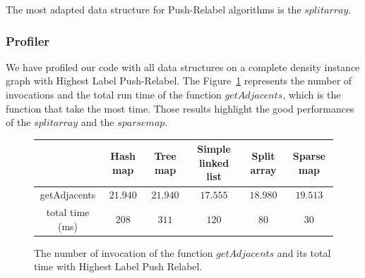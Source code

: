 The most adapted data structure for Push-Relabel algorithms is the $split array$.

\subsubsection{Profiler}
We have profiled our code with all data structures on a complete density instance graph with Highest Label Push-Relabel. The Figure~\ref{fig:pradja} represents the number of invocations and the total run time of the function $getAdjacents$, which is the function that take the most time. Those results highlight the good performances of the $split array$ and the $sparse map$.

\begin{figure}[H]
\centering
\begin{tabular}{|c|c|c|c|c|c|}
	\hline
     & \textbf{Hash map} & \textbf{Tree map} & \textbf{Simple linked list} & \textbf{Split array} & \textbf{Sparse map}\\
     \hline	
   getAdjacents & $21.940$ & $21.940$ & $17.555$ & $18.980$ & $19.513$ \\
   total time (ms) & $208$ & $311$ & $120$ & $80$ & $30$ \\
   \hline
\end{tabular}
\caption{The number of invocation of the function $getAdjacents$ and its total time with Highest Label Push Relabel.}
\label{fig:pradja}
\end{figure}


